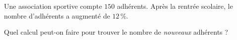 
Une association sportive compte $150$ adhérents. Après la rentrée scolaire, le nombre d'adhérents a augmenté de $12\,\%$.

Quel calcul peut-on faire pour trouver le nombre de \emph{nouveaux} adhérents ?

\smallskip
{}
